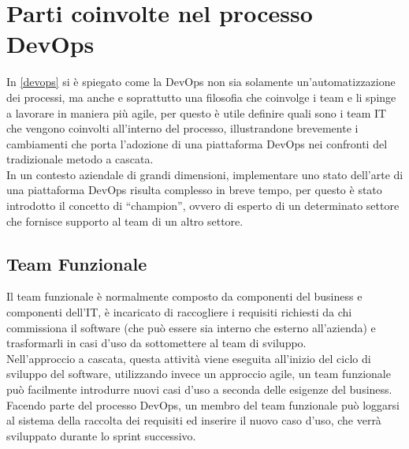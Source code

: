 \documentclass[a4paper, 12pt]{report}
\numberwithin{equation}{section}
\begin{document}
\chapter{Parti coinvolte nel processo DevOps}
In \ref{devops} si è spiegato come la DevOps non sia solamente un’automatizzazione dei processi, ma  anche e soprattutto una filosofia che coinvolge i team e li spinge a lavorare in maniera più agile, per questo è utile definire quali sono i team IT che vengono coinvolti all’interno del processo, illustrandone brevemente i cambiamenti che porta l’adozione di una piattaforma DevOps nei confronti del tradizionale metodo a cascata.\\
In un contesto aziendale di grandi dimensioni, implementare uno stato dell’arte di una piattaforma DevOps risulta complesso in breve tempo, per questo è stato introdotto il concetto di “champion”, ovvero di esperto di un determinato settore che fornisce supporto al team di un altro settore.

\section{Team Funzionale}
Il team funzionale è normalmente composto da componenti del business e componenti dell’IT, è incaricato di raccogliere i requisiti richiesti da chi commissiona il software (che può essere sia interno che esterno all’azienda) e trasformarli in casi d’uso da sottomettere al team di sviluppo.\\
Nell’approccio a cascata, questa attività viene eseguita all’inizio del ciclo di sviluppo del software, utilizzando invece un approccio agile, un team funzionale può facilmente introdurre nuovi casi d’uso a seconda delle esigenze del business. Facendo parte del processo DevOps, un membro del team funzionale può loggarsi al sistema della raccolta dei requisiti ed inserire il nuovo caso d’uso, che verrà sviluppato durante lo sprint successivo.
\end{document}
